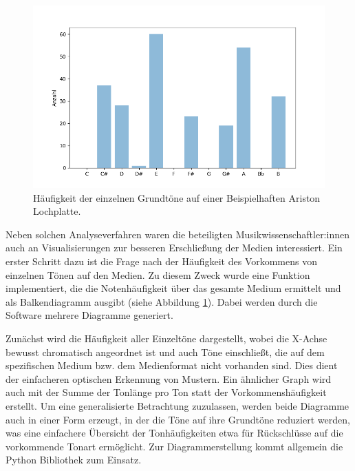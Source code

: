 \begin{figure}[t]
    \centering
    \includegraphics[width=\textwidth]{graphics/base_note_frequencies.png}
    \caption{Häufigkeit der einzelnen Grundtöne auf einer Beispielhaften Ariston Lochplatte.}
    \label{barcharts}
\end{figure}

Neben solchen Analyseverfahren waren die beteiligten Musikwissenschaftler:innen auch an Visualisierungen zur besseren Erschließung der Medien interessiert.
Ein erster Schritt dazu ist die Frage nach der Häufigkeit des Vorkommens von einzelnen Tönen auf den Medien.
Zu diesem Zweck wurde eine Funktion implementiert, die die Notenhäufigkeit über das gesamte Medium ermittelt und als Balkendiagramm ausgibt (siehe Abbildung \ref{barcharts}).
Dabei werden durch die Software mehrere Diagramme generiert.

Zunächst wird die Häufigkeit aller Einzeltöne dargestellt, wobei die X-Achse bewusst chromatisch angeordnet ist und auch Töne einschließt, die auf dem spezifischen Medium bzw. dem Medienformat nicht vorhanden sind.
Dies dient der einfacheren optischen Erkennung von Mustern.
Ein ähnlicher Graph wird auch mit der Summe der Tonlänge pro Ton statt der Vorkommenshäufigkeit erstellt.
Um eine generalisierte Betrachtung zuzulassen, werden beide Diagramme auch in einer Form erzeugt, in der die Töne auf ihre Grundtöne reduziert werden, was eine einfachere Übersicht der Tonhäufigkeiten etwa für Rückschlüsse auf die vorkommende Tonart ermöglicht.
Zur Diagrammerstellung kommt allgemein die Python Bibliothek  \parencite[]{Hunter_2007} zum Einsatz.


